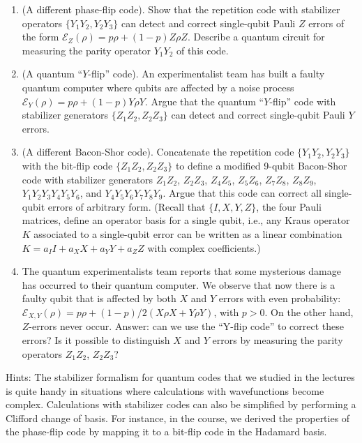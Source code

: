 \documentclass[catalan,spanish,english]{exam}
\begin{document}
\begin{enumerate}
    \item (A different phase-flip code). Show that the repetition code with stabilizer operators $\{ Y_1Y_2, Y_2Y_3\}$ can detect and correct single-qubit Pauli $Z$ errors of the form  $\mathcal{E}_Z(\rho)= p \rho + (1-p) Z \rho Z $. Describe a quantum circuit for measuring the parity operator $Y_1Y_2$ of this code.
    \item   (A quantum ``$Y$-flip'' code).  An experimentalist team has built a faulty quantum computer where qubits are affected by a noise process $\mathcal{E}_Y(\rho)= p \rho + (1-p) Y \rho Y $. Argue that the quantum ``$Y$-flip'' code with stabilizer generators $\{ Z_1Z_2, Z_2Z_3\}$ can detect and correct single-qubit Pauli $Y$ errors.
    \item (A different Bacon-Shor code). Concatenate the repetition code $\{ Y_1Y_2, Y_2Y_3\}$ with the  bit-flip code $\{ Z_1Z_2, Z_2Z_3\}$ to define a modified 9-qubit Bacon-Shor code with stabilizer generators 
  $Z_1 Z_2$, $Z_2Z_3$, $Z_4 Z_5$, $Z_5Z_6$, $Z_7 Z_8$, $Z_8Z_9$, $Y_1Y_2Y_3Y_4Y_5Y_6$, and $Y_4Y_5Y_6 Y_7 Y_8 Y_9$. Argue that this code can correct all single-qubit errors of arbitrary form. (Recall that $\{I, X, Y, Z\}$, the four Pauli matrices, define an operator basis for a single qubit, i.e., any Kraus operator $K$ associated to a single-qubit error can be written as a linear combination $K= a_I I + a_X X + a_Y Y + a_Z Z$ with complex coefficients.)
    \item The quantum experimentalists team reports that some mysterious damage has occurred to their  quantum computer. We observe that now there is a faulty qubit that is affected by both $X$ and $Y$ errors with even probability: $\mathcal{E}_{X,Y}(\rho)= p \rho + (1-p)/2 (X\rho X + Y \rho Y)$, with $p>0$. On the other hand, $Z$-errors never occur. Answer: can we use the ``Y-flip code'' to correct these errors? Is it possible to  distinguish $X$ and $Y$ errors  by measuring the parity operators  $Z_1 Z_2$, $Z_2 Z_3$?
\end{enumerate}
Hints: The stabilizer formalism for quantum codes that we studied in the lectures is quite handy in situations where calculations with wavefunctions become complex. Calculations with stabilizer codes can also  be  simplified by performing a Clifford change of basis. For instance, in the course, we derived the properties of the phase-flip code by mapping it to a bit-flip code in the Hadamard basis. 
\end{document}
